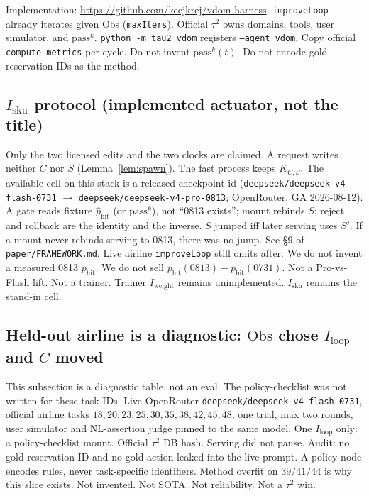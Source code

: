 \documentclass{article}
\begin{document}
Implementation: \url{https://github.com/keejkrej/vdom-harness}. \texttt{improveLoop} already iterates given \(\mathrm{Obs}\) (\texttt{maxIters}). Official \(\tau^2\) owns domains, tools, user simulator, and \(\mathrm{pass}^k\). \texttt{python -m tau2\_vdom} registers \texttt{--agent vdom}. Copy official \texttt{compute\_metrics} per cycle. Do not invent \(\mathrm{pass}^k(t)\). Do not encode gold reservation IDs as the method.

\subsection{\(I_{\mathrm{sku}}\) protocol (implemented actuator, not the title)}
\label{sec:iweight}

Only the two licensed edits and the two clocks are claimed. A request writes neither \(C\) nor \(S\) (Lemma~\ref{lem:spawn}). The fast process keeps \(K_{C,S}\). The available cell on this stack is a released checkpoint id (\texttt{deepseek/deepseek-v4-flash-0731} \(\to\) \texttt{deepseek/deepseek-v4-pro-0813}; OpenRouter, GA 2026-08-12). A gate reads fixture \(\hat p_{\mathrm{hit}}\) (or \(\mathrm{pass}^k\)), not ``0813 exists''; mount rebinds \(S\); reject and rollback are the identity and the inverse. \(S\) jumped iff later serving uses \(S'\). If a mount never rebinds serving to 0813, there was no jump. See \S9 of \texttt{paper/FRAMEWORK.md}. Live airline \texttt{improveLoop} still omits after. We do not invent a measured 0813 \(p_{\mathrm{hit}}\). We do not sell \(p_{\mathrm{hit}}(0813)-p_{\mathrm{hit}}(0731)\). Not a Pro-vs-Flash lift. Not a trainer. Trainer \(I_{\mathrm{weight}}\) remains unimplemented. \(I_{\mathrm{sku}}\) remains the stand-in cell.

\subsection{Held-out airline is a diagnostic: \(\mathrm{Obs}\) chose \(I_{\mathrm{loop}}\) and \(C\) moved}
\label{sec:airloop}

This subsection is a diagnostic table, not an eval. The policy-checklist was not written for these task IDs. Live OpenRouter \texttt{deepseek/deepseek-v4-flash-0731}, official airline tasks \(18,20,23,25,30,35,38,42,45,48\), one trial, max two rounds, user simulator and NL-assertion judge pinned to the same model. One \(I_{\mathrm{loop}}\) only: a policy-checklist mount. Official \(\tau^2\) DB hash. Serving did not pause. Audit: no gold reservation ID and no gold action leaked into the live prompt. A policy node encodes rules, never task-specific identifiers. Method overfit on \(39/41/44\) is why this slice exists. Not invented. Not SOTA. Not reliability. Not a \(\tau^2\) win.
\end{document}
